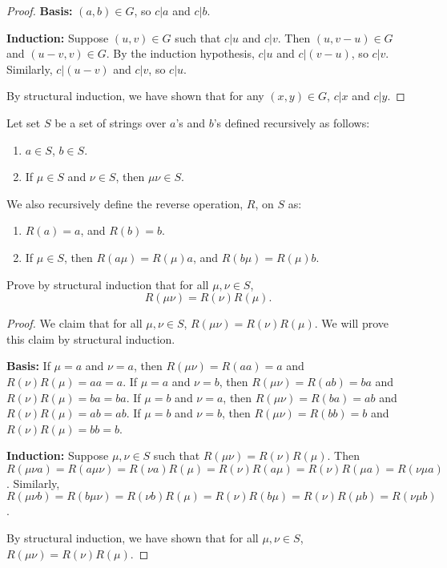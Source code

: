 \documentclass[a4paper]{exam}
\begin{document}
\begin{questions}
\begin{solution}
\begin{proof}
      \textbf{Basis:} $(a, b) \in G$, so $c|a$ and $c|b$.

      \textbf{Induction:} Suppose $(u, v) \in G$ such that $c|u$ and $c|v$. Then $(u, v - u) \in G$ and $(u - v, v) \in G$. By the induction hypothesis, $c|u$ and $c|(v - u)$, so $c|v$. Similarly, $c|(u - v)$ and $c|v$, so $c|u$.

      By structural induction, we have shown that for any $(x, y) \in G$, $c|x$ and $c|y$.
    \end{proof}
  \end{solution}

  
\question
  Let set $S$ be a set of strings over $a$'s and $b$'s defined recursively as follows:
  \begin{enumerate}
  \item $a \in S$, $b \in S$.
  \item If $\mu \in S$ and $\nu \in S$, then $\mu\nu \in S$.
  \end{enumerate}
  We also recursively define the reverse operation, $R$, on $S$ as:
  \begin{enumerate}
  \item $R(a) = a$, and $R(b) = b$.
  \item If $\mu \in S$, then $R(a\mu) = R(\mu)a$, and $R(b\mu) = R(\mu)b$.
  \end{enumerate}
  Prove by structural induction that for all $\mu, \nu \in S$,
  \[ R(\mu\nu) = R(\nu)R(\mu). \]

  \begin{solution}
    \begin{proof}
      We claim that for all $\mu, \nu \in S$, $R(\mu\nu) = R(\nu)R(\mu)$. We will prove this claim by structural induction.

      \textbf{Basis:} If $\mu = a$ and $\nu = a$, then $R(\mu\nu) = R(aa) = a$ and $R(\nu)R(\mu) = aa = a$.
      If $\mu = a$ and $\nu = b$, then $R(\mu\nu) = R(ab) = ba$ and $R(\nu)R(\mu) = ba = ba$.
      If $\mu = b$ and $\nu = a$, then $R(\mu\nu) = R(ba) = ab$ and $R(\nu)R(\mu) = ab = ab$.
      If $\mu = b$ and $\nu = b$, then $R(\mu\nu) = R(bb) = b$ and $R(\nu)R(\mu) = bb = b$.

      \textbf{Induction:} Suppose $\mu, \nu \in S$ such that $R(\mu\nu) = R(\nu)R(\mu)$.
      Then $R(\mu\nu a) = R(a\mu\nu) = R(\nu a)R(\mu) = R(\nu)R(a\mu) = R(\nu)R(\mu a) = R(\nu\mu a)$.
      Similarly, $R(\mu\nu b) = R(b\mu\nu) = R(\nu b)R(\mu) = R(\nu)R(b\mu) = R(\nu)R(\mu b) = R(\nu\mu b)$.

      By structural induction, we have shown that for all $\mu, \nu \in S$, $R(\mu\nu) = R(\nu)R(\mu)$.
    \end{proof}
  \end{solution}
  
\end{questions}
\end{document}
